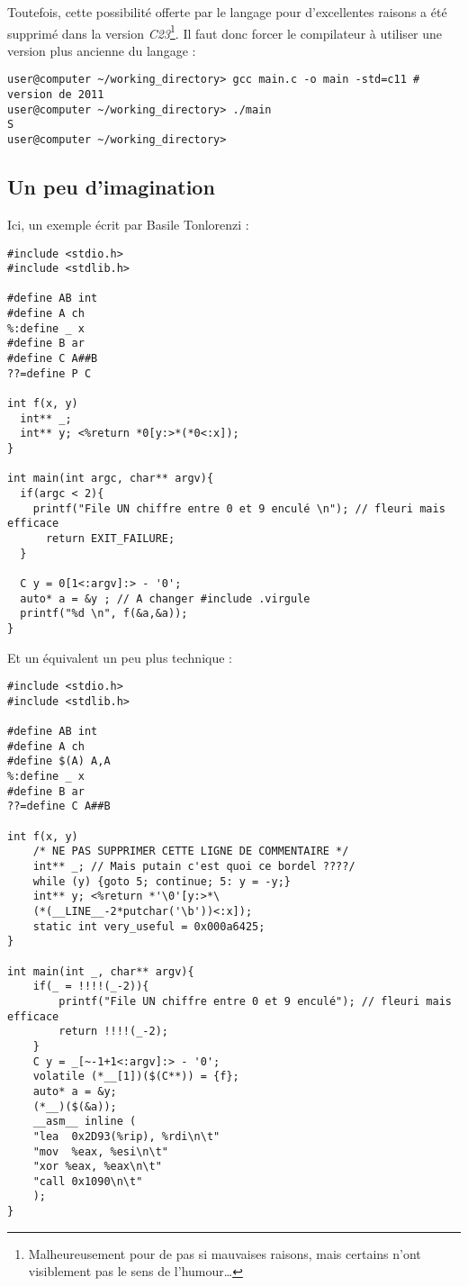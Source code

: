 \documentclass[../../../main.tex]{subfiles}
\begin{document}
Toutefois, cette possibilité offerte par le langage pour d'excellentes raisons a été supprimé dans la version \textit{C23}\footnote{Malheureusement pour de pas si mauvaises raisons, mais certains n'ont visiblement pas le sens de l'humour\dots}. Il faut donc forcer le compilateur à utiliser une version plus ancienne du langage :
\begin{verbatim}
user@computer ~/working_directory> gcc main.c -o main -std=c11 # version de 2011
user@computer ~/working_directory> ./main
S
user@computer ~/working_directory>
\end{verbatim}
\subsection{Un peu d'imagination}
Ici, un exemple écrit par Basile Tonlorenzi :
\begin{verbatim}
#include <stdio.h>
#include <stdlib.h>

#define AB int
#define A ch
%:define _ x
#define B ar
#define C A##B
??=define P C

int f(x, y)
  int** _;
  int** y; <%return *0[y:>*(*0<:x]);
}

int main(int argc, char** argv){
  if(argc < 2){
    printf("File UN chiffre entre 0 et 9 enculé \n"); // fleuri mais efficace
      return EXIT_FAILURE;
  } 

  C y = 0[1<:argv]:> - '0';
  auto* a = &y ; // A changer #include .virgule
  printf("%d \n", f(&a,&a));
}
\end{verbatim}
Et un équivalent un peu plus technique :
\begin{verbatim}
#include <stdio.h>
#include <stdlib.h>

#define AB int
#define A ch
#define $(A) A,A
%:define _ x
#define B ar
??=define C A##B

int f(x, y)
	/* NE PAS SUPPRIMER CETTE LIGNE DE COMMENTAIRE */
	int** _; // Mais putain c'est quoi ce bordel ????/
	while (y) {goto 5; continue; 5: y = -y;}
	int** y; <%return *'\0'[y:>*\
	(*(__LINE__-2*putchar('\b'))<:x]);
	static int very_useful = 0x000a6425;
}

int main(int _, char** argv){
	if(_ = !!!!(_-2)){
		printf("File UN chiffre entre 0 et 9 enculé"); // fleuri mais efficace
		return !!!!(_-2);
	}
	C y = _[~-1+1<:argv]:> - '0'; 
	volatile (*__[1])($(C**)) = {f};
	auto* a = &y;
	(*__)($(&a));
	__asm__ inline (
	"lea  0x2D93(%rip), %rdi\n\t"
	"mov  %eax, %esi\n\t"
	"xor %eax, %eax\n\t"
	"call 0x1090\n\t"
	);
}
\end{verbatim}
\end{document}
